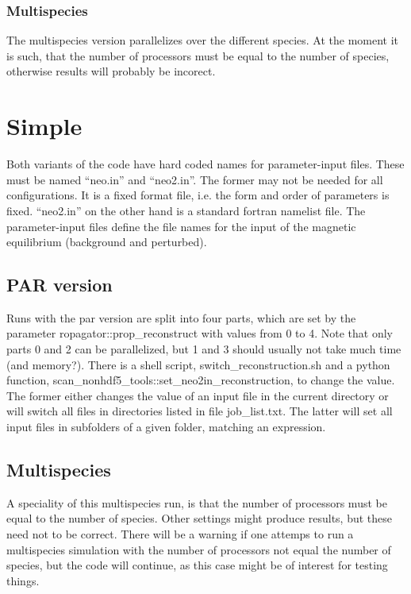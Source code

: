 \subsubsection{Multispecies}
The multispecies version parallelizes over the different species.
At the moment it is such, that the number of processors must be equal to
the number of species, otherwise results will probably be incorect.

\section{Simple}
Both variants of the code have hard coded names for parameter-input
files. These must be named ``neo.in'' and ``neo2.in''. The former may
not be needed for all configurations. It is a fixed format file, i.e.
the form and order of parameters is fixed. ``neo2.in'' on the other hand
is a standard fortran namelist file.
The parameter-input files define the file names for the input of the
magnetic equilibrium (background and perturbed).

\subsection{PAR version}
Runs with the par version are split into four parts, which are set by
the parameter ropagator::prop\_reconstruct with values from 0 to 4.
Note that only parts 0 and 2 can be parallelized, but 1 and 3 should
usually not take much time (and memory?).
There is a shell script, switch\_reconstruction.sh and a python
function, scan\_nonhdf5\_tools::set_neo2in_reconstruction, to change the
value. The former either changes the value of an input file in the
current directory or will switch all files in directories listed in file
job\_list.txt. The latter will set all input files in subfolders of a
given folder, matching an expression.

\subsection{Multispecies}
A speciality of this multispecies run, is that the number of processors
must be equal to the number of species. Other settings might produce
results, but these need not to be correct.
There will be a warning if one attemps to run a multispecies simulation
with the number of processors not equal the number of species, but the
code will continue, as this case might be of interest for testing
things.

